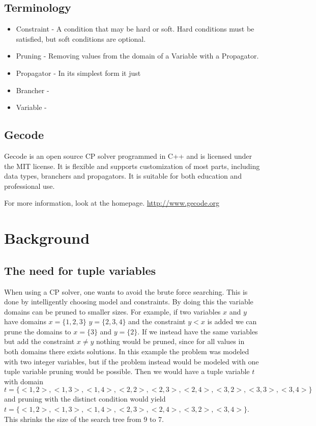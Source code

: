 \documentclass[a4paper,11pt]{article}
\begin{document}
\subsection{Terminology}
\begin{itemize}
\item{Constraint - A condition that may be hard or soft. Hard conditions must be satisfied, but soft conditions are optional.}
\item{Pruning} - Removing values from the domain of a Variable with a Propagator.
\item{Propagator} - In its simplest form it just
\item{Brancher} -
\item{Variable} -

\end{itemize}

\subsection{Gecode}
Gecode is an open source CP solver programmed in C++ and is licensed under the MIT license. It is flexible and supports customization of most parts, including data types, branchers and propagators. It is suitable for both education and professional use.

For more information, look at the homepage. \url{http://www.gecode.org}

\section{Background}
\subsection{The need for tuple variables}
When using a CP solver, one wants to avoid the brute force searching. This is done by intelligently choosing model and constraints. By doing this the variable domains can be pruned to smaller sizes. For example, if two variables $x$ and $y$ have domains $x=\{1,2,3\}$ $y=\{2,3,4\}$ and the constraint $y<x$ is added we can prune the domains to $x=\{3\}$ and $y=\{2\}$. If we instead have the same variables but add the constraint $x\neq y$ nothing would be pruned, since for all values in both domains there exists solutions. In this example the problem was modeled with two integer variables, but if the problem instead would be modeled with one tuple variable pruning would be possible. Then we would have a tuple variable $t$ with domain $t=\{<1,2>,<1,3>,<1,4>,<2,2>,<2,3>,<2,4>,<3,2>,<3,3>,<3,4>\}$ and pruning with the distinct condition would yield $t=\{<1,2>,<1,3>,<1,4>,<2,3>,<2,4>,<3,2>,<3,4>\}$. This shrinks the size of the search tree from 9 to 7. 
\end{document}
